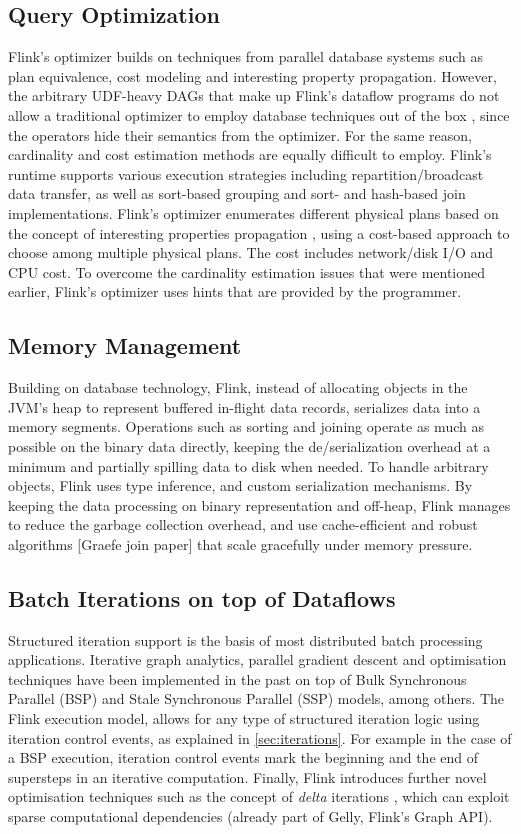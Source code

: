 \subsection{Query Optimization} 

Flink’s optimizer builds on techniques from parallel database systems such as plan equivalence, cost modeling and interesting property propagation. However, the arbitrary UDF-heavy DAGs that make up Flink’s dataflow programs do not allow a traditional optimizer to employ database techniques out of the box \cite{blackBoxes}, since the operators hide their semantics from the optimizer. For the same reason, cardinality and cost estimation methods are equally difficult to employ. Flink’s runtime supports various execution strategies including repartition/broadcast data transfer, as well as sort-based grouping and sort- and hash-based join implementations. Flink’s optimizer enumerates different physical plans based on the concept of interesting properties propagation \cite{scopeOptimizer}, using a cost-based approach to choose among multiple physical plans. The cost includes network/disk I/O and CPU cost. To overcome the cardinality estimation issues that were mentioned earlier,  Flink’s optimizer uses hints that are provided by the programmer.


\subsection{Memory Management} Building on database technology, Flink, instead of allocating objects in the JVM’s heap to represent buffered in-flight data records, serializes data into a  memory segments. Operations such as sorting and joining operate as much as possible on the binary data directly, keeping the de/serialization overhead at a minimum and partially spilling data to disk when needed. To handle arbitrary objects, Flink uses type inference, and  custom serialization mechanisms.  By keeping the data processing on binary representation and off-heap, Flink manages to reduce the garbage collection overhead, and use cache-efficient and robust algorithms [Graefe join paper] that scale gracefully under memory pressure.

\subsection{Batch Iterations on top of Dataflows}
\label{sec:batch-iterations}
Structured iteration support is the basis of most distributed batch processing applications. Iterative graph analytics, parallel gradient descent and optimisation techniques have been implemented in the past on top of Bulk Synchronous Parallel (BSP) and Stale Synchronous Parallel (SSP) models, among others. The Flink execution model, allows for any type of structured iteration logic using iteration control events, as explained in \autoref{sec:iterations}. For example in the case of a BSP execution, iteration control events mark the beginning and the end of supersteps in an iterative computation. Finally, Flink introduces further novel optimisation techniques such as the concept of \emph{delta} iterations \cite{DBLP:journals/pvldb/EwenTKM12}, which can exploit sparse computational dependencies (already part of Gelly, Flink's Graph API).  

